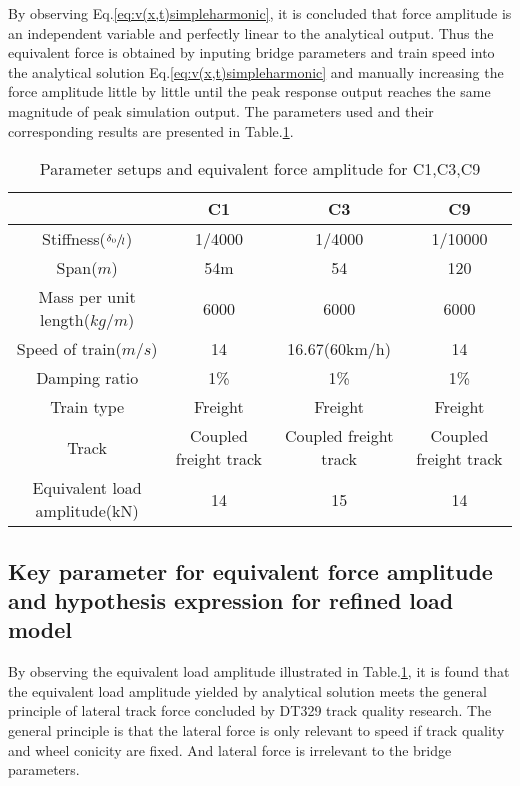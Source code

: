 By observing Eq.\ref{eq:v(x,t)simpleharmonic}, it is concluded that force amplitude is an independent variable and perfectly linear to the analytical output. Thus the equivalent force is obtained by inputing bridge parameters and train speed into the analytical solution Eq.\ref{eq:v(x,t)simpleharmonic} and manually increasing the force amplitude little by little until the peak response output reaches the same magnitude of peak simulation output. The parameters used and their corresponding results are presented in Table.\ref{tab:parametersetupsandequivalentforce}.


\begin{table}[h!]
    \centering
    \caption{Parameter setups and equivalent force amplitude for C1,C3,C9}
    \begin{tabular}{c|ccc}
        \hline
        & C1 & C3 & C9 \\
        \hline
        Stiffness($\sfrac{\delta_0}{l}$) & 1/4000 & 1/4000 & 1/10000 \\
        Span($m$) & 54m & 54 & 120 \\ 
        Mass per unit length($kg/m$) & 6000 & 6000 & 6000\\
        Speed of train($m/s$) & 14 & 16.67(60km/h) & 14\\
        Damping ratio & 1\% & 1\% & 1\%\\
        Train type & Freight & Freight & Freight \\
        Track & Coupled freight track & Coupled freight track & Coupled freight track \\
        \hline
        Equivalent load amplitude(kN) & 14 & 15 & 14 \\
        \hline
    \end{tabular}
    \label{tab:parametersetupsandequivalentforce}
\end{table}

\subsection{Key parameter for equivalent force amplitude and hypothesis expression for refined load model}\label{sec:keyparameterforequivalentamplitudeandhypothesis}

By observing the equivalent load amplitude illustrated in Table.\ref{tab:parametersetupsandequivalentforce}, it is found that the equivalent load amplitude yielded by analytical solution meets the general principle of lateral track force concluded by DT329 track quality research. The general principle is that the lateral force is only relevant to speed if track quality and wheel conicity are fixed. And lateral force is irrelevant to the bridge parameters.
 
